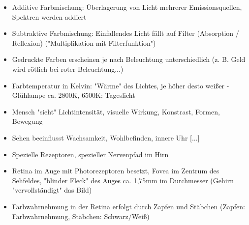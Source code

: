 \documentclass[12pt,landscape]{article}
\begin{document}
\begin{multicols}{3}
\begin{itemize}
\item Additive Farbmischung: Überlagerung von Licht mehrerer Emissionsquellen, Spektren werden addiert
\item Subtraktive Farbmischung: Einfallendes Licht fällt auf Filter (Absorption / Reflexion) ("Multiplikation mit Filterfunktion")
\item Gedruckte Farben erscheinen je nach Beleuchtung unterschiedlich (z. B. Geld wird rötlich bei roter Beleuchtung...) 
\item Farbtemperatur in Kelvin: "Wärme" des Lichtes, je höher desto weißer - Glühlampe ca. 2800K, 6500K: Tageslicht
\item Mensch "sieht" Lichtintensität, visuelle Wirkung, Konstrast, Formen, Bewegung
\item Sehen beeinflusst Wachsamkeit, Wohlbefinden, innere Uhr [...]
\item Spezielle Rezeptoren, spezieller Nervenpfad im Hirn
\item Retina im Auge mit Photorezeptoren besetzt, Fovea im Zentrum des Sehfeldes, "blinder Fleck" des Auges ca. 1,75mm im Durchmesser (Gehirn "vervollständigt" das Bild)
\item Farbwahrnehmung in der Retina erfolgt durch Zapfen und Stäbchen (Zapfen: Farbwahrnehmung, Stäbchen: Schwarz/Weiß)
\end{itemize}

\end{multicols}
\end{document}
